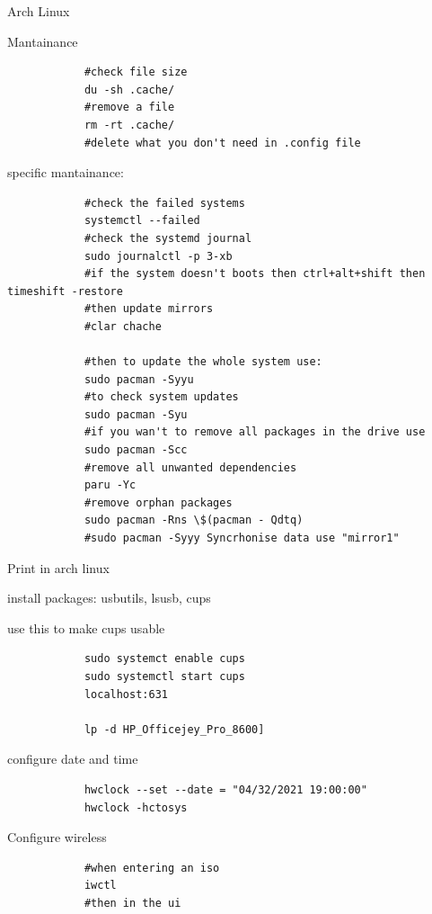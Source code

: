 \newpage
\begin{section}{Arch Linux}
	\begin{subsection}{Mantainance}
		\begin{verbatim}
			#check file size
			du -sh .cache/
			#remove a file
			rm -rt .cache/
			#delete what you don't need in .config file
		\end{verbatim}

		specific mantainance:

		\begin{verbatim}
			#check the failed systems
			systemctl --failed
			#check the systemd journal
			sudo journalctl -p 3-xb
			#if the system doesn't boots then ctrl+alt+shift then timeshift -restore
			#then update mirrors
			#clar chache

			#then to update the whole system use:
			sudo pacman -Syyu
			#to check system updates
			sudo pacman -Syu
			#if you wan't to remove all packages in the drive use
			sudo pacman -Scc
			#remove all unwanted dependencies
			paru -Yc 
			#remove orphan packages
			sudo pacman -Rns \$(pacman - Qdtq)
			#sudo pacman -Syyy Syncrhonise data use "mirror1"
		\end{verbatim}

	\end{subsection}
	\begin{subsection}{Print in arch linux}

		install packages: usbutils, lsusb, cups

		use this to make cups usable
		\begin{verbatim}
			sudo systemct enable cups
			sudo systemctl start cups
			localhost:631

			lp -d HP_Officejey_Pro_8600]
		\end{verbatim}

	\end{subsection}


	\begin{subsection}{configure date and time}

		\begin{verbatim}
			hwclock --set --date = "04/32/2021 19:00:00"
			hwclock -hctosys
		\end{verbatim}

	\end{subsection}

	\begin{subsection}{Configure wireless}

		\begin{verbatim}
			#when entering an iso
			iwctl
			#then in the ui


\end{verbatim}
\end{subsection}
\end{section}
